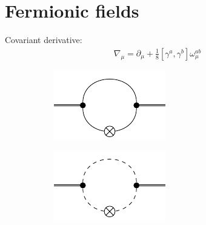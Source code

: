 \section{Fermionic fields}
Covariant derivative:
\begin{align}
	\nabla_{\mu} = \partial_{\mu} + \frac{1}{8}\left[\gamma^{a}, \gamma^{b}\right]\omega_{\mu}^{ab}
\end{align}
\blindtext
 \begin{figure}[t]
 \centering
 \hfill
 \begin{subfigure}{0.3\textwidth} 
	\includegraphics[width=\textwidth]{figs/TikZ/fermion_contribution}
 \end{subfigure}
 \hfill
 \begin{subfigure}{0.3\textwidth} 
 	\includegraphics[width=\textwidth]{figs/TikZ/scalar_contribution}
 \end{subfigure} 
 \hfill
 \begin{subfigure}{0.3\textwidth} 

\end{subfigure}
\end{figure}
